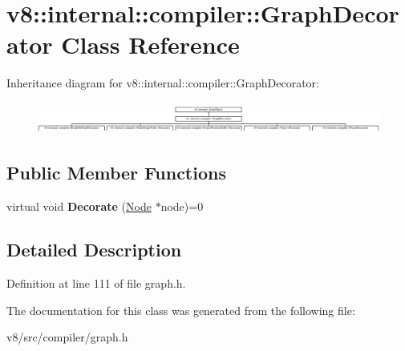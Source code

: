 \hypertarget{classv8_1_1internal_1_1compiler_1_1GraphDecorator}{}\section{v8\+:\+:internal\+:\+:compiler\+:\+:Graph\+Decorator Class Reference}
\label{classv8_1_1internal_1_1compiler_1_1GraphDecorator}
Inheritance diagram for v8\+:\+:internal\+:\+:compiler\+:\+:Graph\+Decorator\+:\begin{figure}[H]
\begin{center}
\leavevmode
\includegraphics[height=1.046729cm]{classv8_1_1internal_1_1compiler_1_1GraphDecorator}
\end{center}
\end{figure}
\subsection*{Public Member Functions}
\begin{DoxyCompactItemize}
\item 
\mbox{\label{classv8_1_1internal_1_1compiler_1_1GraphDecorator_ac4ce579c72bf1a98aa0bbb1e39d4d23e}} 
virtual void {\bfseries Decorate} (\mbox{\hyperlink{classv8_1_1internal_1_1compiler_1_1Node}{Node}} $\ast$node)=0
\end{DoxyCompactItemize}


\subsection{Detailed Description}


Definition at line 111 of file graph.\+h.



The documentation for this class was generated from the following file\+:\begin{DoxyCompactItemize}
\item 
v8/src/compiler/graph.\+h\end{DoxyCompactItemize}

